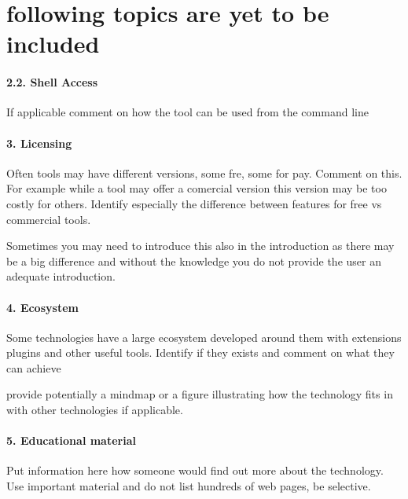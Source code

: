 \documentclass[9pt,twocolumn,twoside]{styles/osajnl}
\begin{document}
\section{following topics are yet to be included}
\paragraph{2.2. Shell Access}
If applicable comment on how the tool can be used from the command
line
\paragraph{3. Licensing}
Often tools may have different versions, some fre, some for
pay. Comment on this. For example while a tool may offer a comercial
version this version may be too costly for others. Identify especially
the difference between features for free vs commercial tools.

Sometimes you may need to introduce this also in the introduction as
there may be a big difference and without the knowledge you do not
provide the user an adequate introduction.

\paragraph{4. Ecosystem}

Some technologies have a large ecosystem developed around them with
extensions plugins and other useful tools. Identify if they exists and
comment on what they can achieve

provide potentially a mindmap or a figure illustrating how the
technology fits in with other technologies if applicable.


\paragraph{5. Educational material}

Put information here how someone would find out more about the
technology. Use important material and do not list hundreds of web
pages, be selective.
\end{document}
